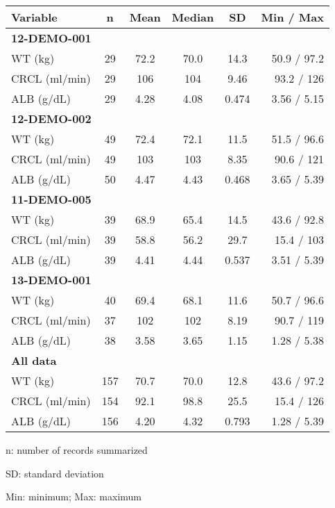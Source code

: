 \setlength{\tabcolsep}{5pt} 
\begin{threeparttable}
\renewcommand{\arraystretch}{1.3}
\begin{tabular}[h]{lccccr}
\hline
Variable & n & Mean & Median & SD & Min / Max \\
\hline
\multicolumn{6}{l}{\textbf{12-DEMO-001}}\\
WT (kg) & 29 & 72.2 & 70.0 & 14.3 & 50.9 / 97.2 \\
CRCL (ml/min) & 29 & 106 & 104 & 9.46 & 93.2 / 126 \\
ALB (g/dL) & 29 & 4.28 & 4.08 & 0.474 & 3.56 / 5.15 \\
\hline \multicolumn{6}{l}{\textbf{12-DEMO-002}}\\
WT (kg) & 49 & 72.4 & 72.1 & 11.5 & 51.5 / 96.6 \\
CRCL (ml/min) & 49 & 103 & 103 & 8.35 & 90.6 / 121 \\
ALB (g/dL) & 50 & 4.47 & 4.43 & 0.468 & 3.65 / 5.39 \\
\hline \multicolumn{6}{l}{\textbf{11-DEMO-005}}\\
WT (kg) & 39 & 68.9 & 65.4 & 14.5 & 43.6 / 92.8 \\
CRCL (ml/min) & 39 & 58.8 & 56.2 & 29.7 & 15.4 / 103 \\
ALB (g/dL) & 39 & 4.41 & 4.44 & 0.537 & 3.51 / 5.39 \\
\hline \multicolumn{6}{l}{\textbf{13-DEMO-001}}\\
WT (kg) & 40 & 69.4 & 68.1 & 11.6 & 50.7 / 96.6 \\
CRCL (ml/min) & 37 & 102 & 102 & 8.19 & 90.7 / 119 \\
ALB (g/dL) & 38 & 3.58 & 3.65 & 1.15 & 1.28 / 5.38 \\
\hline \multicolumn{6}{l}{\textbf{All data}}\\
WT (kg) & 157 & 70.7 & 70.0 & 12.8 & 43.6 / 97.2 \\
CRCL (ml/min) & 154 & 92.1 & 98.8 & 25.5 & 15.4 / 126 \\
ALB (g/dL) & 156 & 4.20 & 4.32 & 0.793 & 1.28 / 5.39 \\
\hline
\end{tabular}
\begin{tablenotes}[flushleft]
\item n: number of records summarized
\item SD: standard deviation
\item Min: minimum; Max: maximum
\end{tablenotes}
\end{threeparttable}

